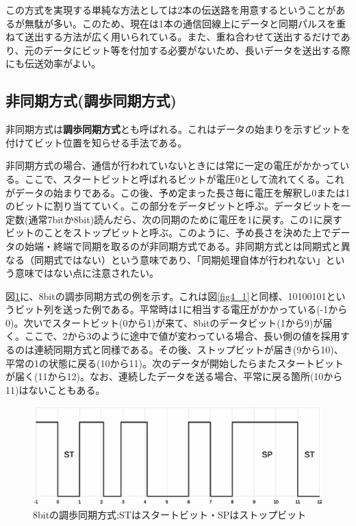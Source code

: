 この方式を実現する単純な方法としては2本の伝送路を用意するということがあるが無駄が多い。このため、現在は1本の通信回線上にデータと同期パルスを重ねて送出する方法が広く用いられている。また、重ね合わせて送出するだけであり、元のデータにビット等を付加する必要がないため、長いデータを送出する際にも伝送効率がよい。

\subsection{非同期方式(調歩同期方式)}
非同期方式は\textbf{調歩同期方式}とも呼ばれる。これはデータの始まりを示すビットを付けてビット位置を知らせる手法である。

非同期方式の場合、通信が行われていないときには常に一定の電圧がかかっている。ここで、スタートビットと呼ばれるビットが電圧0として流れてくる。これがデータの始まりである。この後、予め定まった長さ毎に電圧を解釈し0または1のビットに割り当てていく。この部分をデータビットと呼ぶ。データビットを一定数(通常7bitか8bit)読んだら、次の同期のために電圧を1に戻す。この1に戻すビットのことをストップビットと呼ぶ。このように、予め長さを決めた上でデータの始端・終端で同期を取るのが非同期方式である。非同期方式とは同期式と異なる（同期式ではない）という意味であり、「同期処理自体が行われない」という意味ではない点に注意されたい。

図\ref{fig4_2}に、8bitの調歩同期方式の例を示す。これは図\ref{fig4_1}と同様、10100101というビット列を送った例である。平常時は1に相当する電圧がかかっている(-1から0)。次いでスタートビット(0から1)が来て、8bitのデータビット(1から9)が届く。ここで、2から3のように途中で値が変わっている場合、長い側の値を採用するのは連続同期方式と同様である。その後、ストップビットが届き(9から10)、平常の1の状態に戻る(10から11)。次のデータが開始したらまたスタートビットが届く(11から12)。なお、連続したデータを送る場合、平常に戻る箇所(10から11)はないこともある。
\begin{figure}[h]
\centering
\includegraphics[width=0.9\linewidth,keepaspectratio]{fig/fig4_2.eps}
\caption{8bitの調歩同期方式:STはスタートビット・SPはストップビット}\label{fig4_2}
\end{figure}

